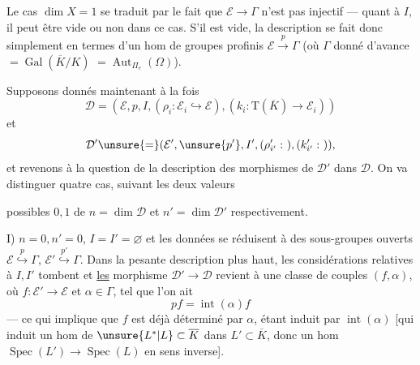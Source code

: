 Le cas $\dim X=1$ se traduit par le fait que $\mathcal E\longrightarrow\Gamma$ n'est pas injectif --- quant à $I$, il peut être vide ou non dans ce cas.
S'il est vide, la description se fait donc simplement en termes d'un hom de groupes profinis $\mathcal E\xrightarrow{p}\Gamma$ (où $\Gamma$ donné d'avance $=\operatorname{Gal}(\overline K/K)$ \unsure{\}} $=\operatorname{Aut}_{\Pi_e}(\Omega)$).

Supposons donnés maintenant à la fois
\[
\mathcal D=(\mathcal E,p,I,(\rho_i:\mathcal E_i\hookrightarrow\mathcal E),(k_i:\mathrm T(\overline K)\longrightarrow\mathcal E_i))
\]
et
\[
\mathcal D'\unsure{=} (\mathcal E',\unsure{p'},I',(\rho'_{i'}:\ ),(k'_{i'}:\ )),
\]
et revenons à la question de la description des morphismes de $\mathcal D'$ dans $\mathcal D$.
On va distinguer quatre cas, suivant les deux valeurs

possibles $0,1$ de $n=\dim\mathcal D$ et $n'=\dim\mathcal D'$ respectivement.

I) $n=0,n'=0$,  $I=I'=\varnothing$ et les données se réduisent à des sous-groupes ouverts
$\mathcal E\overset{p}{\hookrightarrow}\Gamma$, $\mathcal E'\overset{p'}{\hookrightarrow}\Gamma$.
Dans la pesante description plus haut,  les considérations relatives à $I,I'$ tombent et \uline{les} morphisme $\mathcal D'\longrightarrow\mathcal D$ revient à une classe de  couples $(f,\alpha)$, où
$f:\mathcal E'\longrightarrow\mathcal E$ et $\alpha\in\Gamma$, tel que l'on ait
\[
pf=\operatorname{int}(\alpha)f
\]
--- ce qui implique que $f$ est déjà déterminé par $\alpha$, étant induit par $\operatorname{int}(\alpha)$
\inserted{[$\alpha$ assujetti à $\alpha\in\operatorname{Trans}_{\Gamma}(\mathcal E',\mathcal E)$ \unsure{$=$} $\operatorname{Trans}_{\Gamma}(L,L')$]}
[qui induit  un hom de $\unsure{L^*|L}\subset\overline K$ dans $L'\subset\overline K$, donc un hom $\operatorname{Spec}(L')\longrightarrow\operatorname{Spec}(L)$ en sens inverse].

